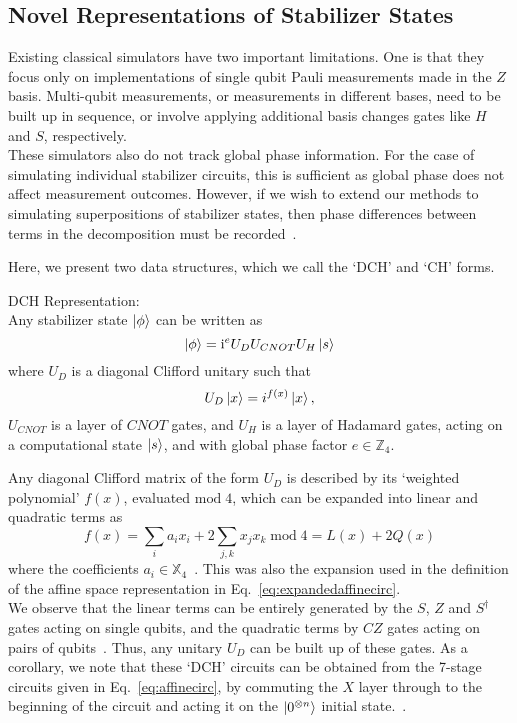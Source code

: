 \subsection{Novel Representations of Stabilizer States}
Existing classical simulators have two important limitations. One is that they focus only on implementations of single qubit Pauli measurements made in the $Z$ basis. Multi-qubit measurements, or measurements in different bases, need to be built up in sequence, or involve applying additional basis changes gates like $H$ and $S$, respectively.\\
These simulators also do not track global phase information. For the case of simulating individual stabilizer circuits, this is sufficient as global phase does not affect measurement outcomes. However, if we wish to extend our methods to simulating superpositions of stabilizer states, then phase differences between terms in the decomposition must be recorded~\cite{Garcia2015}.\par
Here, we present two data structures, which we call the `DCH' and `CH' forms.
\begin{defn}
DCH Representation:\\
Any stabilizer state $\ket{\phi}$ can be written as
\begin{equation}\ket{\phi} = \mathrm{i}^{e}U_{D} U_{CNOT} U_{H} \ket{s}
\label{eq:dch}
\end{equation}
\label{def:dch}
where $U_{D}$ is a diagonal Clifford unitary such that
\begin{equation}
U_{D}\ket{x} = i^{f(x)}\ket{x},
\end{equation}
$U_{CNOT}$ is a layer of $CNOT$ gates, and $U_{H}$ is a layer of Hadamard gates, acting on a computational state $\ket{s}$, and with global phase factor $e\in\mathbb{Z}_{4}$.
\end{defn}
Any diagonal Clifford matrix of the form $U_{D}$ is described by its `weighted polynomial' $f(x)$, evaluated $\text{mod}\; 4$, which can be expanded into linear and quadratic terms as
\begin{equation}
    f(x) = \sum_{i}a_{i}x_{i} + 2\sum_{j,k}x_{j}x_{k}\;\text{mod}\;4 = L(x) + 2Q(x)
\end{equation}
where the coefficients $a_{i}\in\mathbb{X}_{4}$~\cite{VandenNest2008,Campbell2016}. This was also the expansion used in the definition of the affine space representation in Eq.~\ref{eq:expandedaffinecirc}.\\
We observe that the linear terms can be entirely generated by the $S$, $Z$ and $S^{\dagger}$ gates acting on single qubits, and the quadratic terms by $CZ$ gates acting on pairs of qubits~\cite{Campbell2016}. Thus, any unitary $U_{D}$ can be built up of these gates. As a corollary, we note that these `DCH' circuits can be obtained from the 7-stage circuits given in Eq.~\ref{eq:affinecirc}, by commuting the $X$ layer through to the beginning of the circuit and acting it on the $\ket{0^{\otimes n}}$ initial state.~\cite{VandenNest2008}.\par
